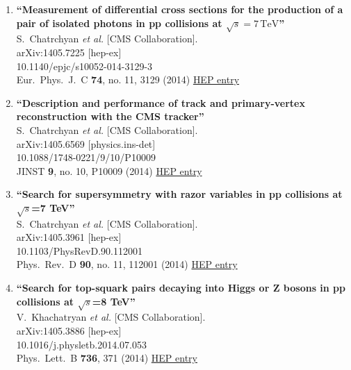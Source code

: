 \documentclass{article}
\begin{document}
\begin{enumerate}
\item%
{\bf ``Measurement of differential cross sections for the production of a pair of isolated photons in pp collisions at $\sqrt{s}=7\,\text {TeV} $''}
  \\{}S.~Chatrchyan {\it et al.} [CMS Collaboration].
  \\{}arXiv:1405.7225 [hep-ex]
    \\{}10.1140/epjc/s10052-014-3129-3
\\{}Eur.\ Phys.\ J.\ C {\bf 74}, no. 11, 3129 (2014) %
\href{http://inspirehep.net/record/1298393}{HEP entry}


\item%
{\bf ``Description and performance of track and primary-vertex reconstruction with the CMS tracker''}
  \\{}S.~Chatrchyan {\it et al.} [CMS Collaboration].
  \\{}arXiv:1405.6569 [physics.ins-det]
    \\{}10.1088/1748-0221/9/10/P10009
\\{}JINST {\bf 9}, no. 10, P10009 (2014) %
\href{http://inspirehep.net/record/1298029}{HEP entry}


\item%
{\bf ``Search for supersymmetry with razor variables in pp collisions at $\sqrt{s}$=7  TeV''}
  \\{}S.~Chatrchyan {\it et al.} [CMS Collaboration].
  \\{}arXiv:1405.3961 [hep-ex]
    \\{}10.1103/PhysRevD.90.112001
\\{}Phys.\ Rev.\ D {\bf 90}, no. 11, 112001 (2014) %
\href{http://inspirehep.net/record/1296262}{HEP entry}


\item%
{\bf ``Search for top-squark pairs decaying into Higgs or Z bosons in pp collisions at $\sqrt{s}$=8 TeV''}
  \\{}V.~Khachatryan {\it et al.} [CMS Collaboration].
  \\{}arXiv:1405.3886 [hep-ex]
    \\{}10.1016/j.physletb.2014.07.053
\\{}Phys.\ Lett.\ B {\bf 736}, 371 (2014) %
\href{http://inspirehep.net/record/1296259}{HEP entry}



\end{enumerate}
\end{document}
